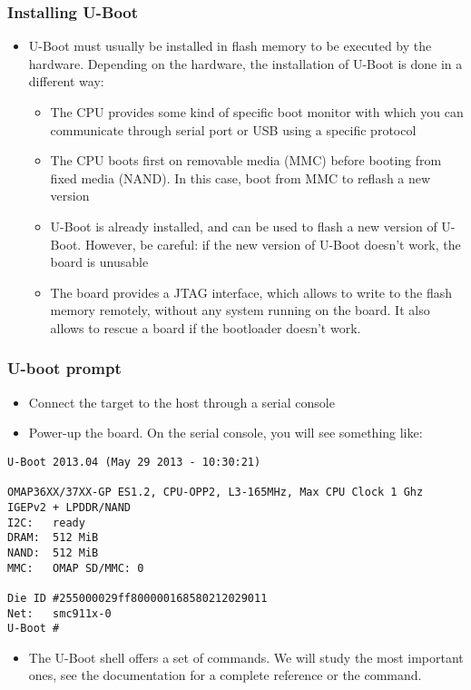 \begin{frame}
  \frametitle{Installing U-Boot}
  \begin{itemize}
  \item U-Boot must usually be installed in flash memory to be
    executed by the hardware. Depending on the hardware, the
    installation of U-Boot is done in a different way:
    \begin{itemize}
    \item The CPU provides some kind of specific boot monitor with
      which you can communicate through serial port or USB using a
      specific protocol
    \item The CPU boots first on removable media (MMC) before booting
      from fixed media (NAND). In this case, boot from MMC to reflash
      a new version
    \item U-Boot is already installed, and can be used to flash a new
      version of U-Boot. However, be careful: if the new version of
      U-Boot doesn't work, the board is unusable
    \item The board provides a JTAG interface, which allows to write
      to the flash memory remotely, without any system running on the
      board. It also allows to rescue a board if the bootloader
      doesn't work.
    \end{itemize}
  \end{itemize}
\end{frame}

\begin{frame}[fragile]
  \frametitle{U-boot prompt}
  \begin{itemize}
  \item Connect the target to the host through a serial console
  \item Power-up the board. On the serial console, you will see
    something like:
  \end{itemize}
\scriptsize
\begin{verbatim}
U-Boot 2013.04 (May 29 2013 - 10:30:21)

OMAP36XX/37XX-GP ES1.2, CPU-OPP2, L3-165MHz, Max CPU Clock 1 Ghz
IGEPv2 + LPDDR/NAND
I2C:   ready
DRAM:  512 MiB
NAND:  512 MiB
MMC:   OMAP SD/MMC: 0

Die ID #255000029ff800000168580212029011
Net:   smc911x-0
U-Boot #
\end{verbatim}
\normalsize
  \begin{itemize}
  \item The U-Boot shell offers a set of commands. We will study the
    most important ones, see the documentation for a complete
    reference or the  command.
  \end{itemize}
\end{frame}

